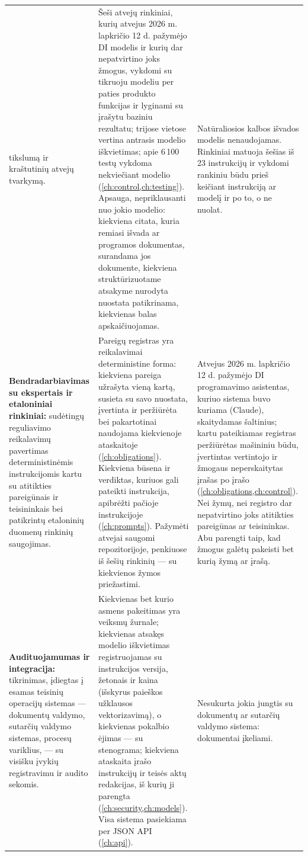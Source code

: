 \begin{xltabular}{\textwidth}{@{}L{34mm}YY@{}}
  tikslumą ir kraštutinių atvejų tvarkymą. &
  Šeši atvejų rinkiniai, kurių atvejus 2026 m. lapkričio 12 d. pažymėjo DI modelis ir kurių dar
  nepatvirtino joks žmogus, vykdomi su tikruoju modeliu per paties produkto funkcijas ir
  lyginami su įrašytu baziniu rezultatu; trijose vietose vertina antrasis modelio
  iškvietimas; apie 6\,100 testų vykdoma nekviečiant modelio (\cref{ch:control,ch:testing}).
  Apsauga, nepriklausanti nuo jokio modelio: kiekviena citata, kuria remiasi išvada ar
  programos dokumentas, surandama jos dokumente, kiekviena struktūrizuotame atsakyme nurodyta
  nuostata patikrinama, kiekvienas balas apskaičiuojamas. &
  Natūraliosios kalbos išvados modelis nenaudojamas. Rinkiniai matuoja šešias iš 23
  instrukcijų ir vykdomi rankiniu būdu prieš keičiant instrukciją ar modelį ir po to, o ne
  nuolat. \\
\textbf{Bendradarbiavimas su ekspertais ir etaloniniai rinkiniai:} sudėtingų reguliavimo
  reikalavimų pavertimas deterministinėmis instrukcijomis kartu su atitikties pareigūnais ir
  teisininkais bei patikrintų etaloninių duomenų rinkinių saugojimas. &
  Pareigų registras yra reikalavimai deterministine forma: kiekviena pareiga užrašyta vieną
  kartą, susieta su savo nuostata, įvertinta ir peržiūrėta bei pakartotinai naudojama kiekvienoje
  ataskaitoje (\cref{ch:obligations}). Kiekviena būsena ir verdiktas, kuriuos gali pateikti
  instrukcija, apibrėžti pačioje instrukcijoje (\cref{ch:prompts}). Pažymėti atvejai saugomi
  repozitorijoje, penkiuose iš šešių rinkinių --- su kiekvienos žymos priežastimi. &
  Atvejus 2026 m. lapkričio 12 d. pažymėjo DI programavimo asistentas, kuriuo sistema buvo
  kuriama (Claude), skaitydamas šaltinius; kartu pateikiamas registras peržiūrėtas mašininiu
  būdu, įvertintas vertintojo ir žmogaus neperskaitytas įrašas po įrašo
  (\cref{ch:obligations,ch:control}). Nei žymų, nei registro dar nepatvirtino joks atitikties
  pareigūnas ar teisininkas. Abu parengti taip, kad žmogus galėtų pakeisti bet kurią žymą ar
  įrašą. \\
\textbf{Audituojamumas ir integracija:} tikrinimas, įdiegtas į esamas teisinių operacijų
  sistemas --- dokumentų valdymo, sutarčių valdymo sistemas, procesų variklius, --- su visišku įvykių
  registravimu ir audito sekomis. &
  Kiekvienas bet kurio asmens pakeitimas yra veiksmų žurnale; kiekvienas atsakęs modelio
  iškvietimas registruojamas su instrukcijos versija, žetonais ir kaina (išskyrus paieškos
  užklausos vektorizavimą), o kiekvienas pokalbio ėjimas --- su stenograma; kiekviena
  ataskaita įrašo instrukcijų ir teisės aktų redakcijas, iš kurių ji parengta
  (\cref{ch:security,ch:models}). Visa sistema pasiekiama per JSON API (\cref{ch:api}). &
  Nesukurta jokia jungtis su dokumentų ar sutarčių valdymo sistema: dokumentai įkeliami. \\
\end{xltabular}

